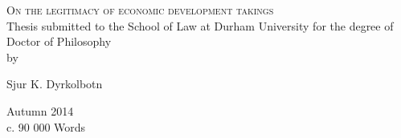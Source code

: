 \begin{titlepage}

\begin{center}



\vspace*{\fill}
\centering

{\Huge\textsc{On the legitimacy of economic development takings}}\\[3cm]

\large {Thesis submitted to the School of Law at Durham University for the degree of Doctor of Philosophy}\\

by

{Sjur K. Dyrkolbotn}\\

\vspace*{\fill}

 

\vfill

{\Large Autumn 2014}\\
{c. 90 000 Words}

\end{center}

\end{titlepage}
